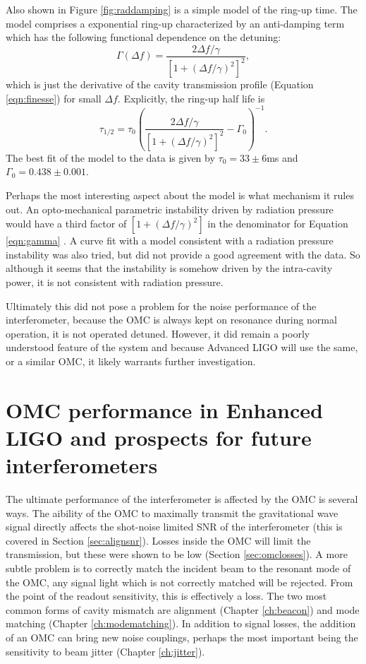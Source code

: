 Also shown in Figure \ref{fig:raddamping} is a simple model of the ring-up time. %
The model comprises a exponential ring-up characterized by an anti-damping term which has the following functional dependence on the detuning:
\begin{equation}
\label{eqn:gamma}
\Gamma(\Delta f)=\frac{2\Delta f/\gamma}{\left[1+\left(\Delta f/\gamma\right)^2\right]^2},
\end{equation}
which is just the derivative of the cavity transmission profile (Equation \ref{eqn:finesse}) for small $\Delta f$. %
Explicitly, the ring-up half life is
\begin{equation}
\tau_{1/2}=\tau_0\left(\frac{2\Delta f/\gamma}{\left[1+\left(\Delta f/\gamma\right)^2\right]^2}-\Gamma_0\right)^{-1}.
\end{equation}
The best fit of the model to the data is given by $\tau_0=33\pm 6$ms and $\Gamma_0=0.438\pm 0.001$.

Perhaps the most interesting aspect about the model is what mechanism it rules out. %
An opto-mechanical parametric instability driven by radiation pressure would have a third factor of $\left[1+\left(\Delta f/\gamma\right)^2\right]$ in the denominator for Equation \ref{eqn:gamma} \cite{Corbitt:7mK}. %
A curve fit with a model consistent with a radiation pressure instability was also tried, but did not provide a good agreement with the data. %
So although it seems that the instability is somehow driven by the intra-cavity power, it is not consistent with radiation pressure.

Ultimately this did not pose a problem for the noise performance of the interferometer, because the OMC is always kept on resonance during normal operation, it is not operated detuned. %
However, it did remain a poorly understood feature of the system and because Advanced LIGO will use the same, or a similar OMC, it likely warrants further investigation.

\section{OMC performance in Enhanced LIGO and prospects for future interferometers}

The ultimate performance of the interferometer is affected by the OMC is several ways. %
The aibility of the OMC to maximally transmit the gravitational wave signal directly affects the shot-noise limited SNR of the interferometer (this is covered in Section \ref{sec:alignsnr}). %
Losses inside the OMC will limit the transmission, but these were shown to be low (Section \ref{sec:omclosses}). %
A more subtle problem is to correctly match the incident beam to the resonant  mode of the OMC, any signal light which is not correctly matched will be rejected. %
From the point of the readout sensitivity, this is effectively a loss. %
The two most common forms of cavity mismatch are alignment (Chapter \ref{ch:beacon}) and mode matching (Chapter \ref{ch:modematching}). %
In addition to signal losses, the addition of an OMC can bring new noise couplings, perhaps the most important being the sensitivity to beam jitter (Chapter \ref{ch:jitter}).

